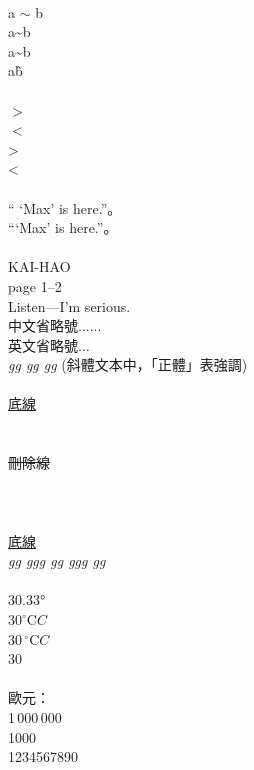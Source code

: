 \documentclass[12pt]{article}
\begin{document}
\begin{CJK*}{UTF8}{bkai}
	\mbox{}\\
	a $\sim$ b  \\
	a\textasciitilde b  \\
	a\~{}b  \\
	a\~b  \\
	
	\mbox{}\\
	$>$ \\
	$<$ \\
	\textgreater \\
	\textless \\
	
	\mbox{}\\	
	`` `Max' is here.''。\\
	``\thinspace`Max' is here.''。\\
	
	\mbox{}\\	
	KAI-HAO\\
	page 1--2\\
	Listen---I'm serious.\\	
	中文省略號......\\
	英文省略號$\ldots$\\
	
	 \emph{gg gg gg} (斜體文本中，「正體」表強調) \\

	\mbox{}\\
	\uline{底線} \\
	 \\
	 \\
	\sout{刪除線} \\
	 \\
	 \\
	 \\
	\uline{底線} \\
	\emph{gg g\emph{gg gg gg}g gg} \\
	
	\mbox{}\\	
	\ang{30.33} \\
	$30^{\circ}\mathrm{C}C$ \\
	$30\,^{\circ}\mathrm{C}C$ \\
	$30\,$\textcelsius \\
	
	\mbox{}\\	
	歐元：\texteuro \\
	\mbox{1\,000\,000}\textdollar \\
	\mbox{1000\textperthousand} \\
	\mbox{\num[group-separator={,}]{1234567890}\textdollar}
	

\end{CJK*}
\end{document}
